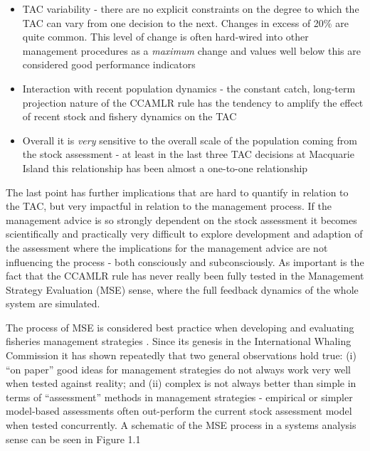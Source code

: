\documentclass[12pt,a4paper,twoside,times,sky,standard]{csiroreport2017}
\begin{document}
\begin{itemize}
    \item TAC variability - there are no explicit constraints on the degree to which the TAC can vary from one decision to the next. Changes in excess of 20\% are quite common. This level of change is often hard-wired into other management procedures as a \emph{maximum} change and values well below this are considered good performance indicators
    \item Interaction with recent population dynamics - the constant catch, long-term projection nature of the CCAMLR rule has the tendency to amplify the effect of recent stock and fishery dynamics on the TAC
    \item Overall it is \emph{very} sensitive to the overall scale of the population coming from the stock assessment - at least in the last three TAC decisions at Macquarie Island this relationship has been almost a one-to-one relationship
\end{itemize}

The last point has further implications that are hard to quantify in relation to the TAC, but very impactful in relation to the management process. If the management advice is so strongly dependent on the stock assessment it becomes scientifically and practically very difficult to explore development and adaption of the assessment where the implications for the management advice are not influencing the process - both consciously and subconsciously. As important is the fact that the CCAMLR rule has never really been fully tested in the Management Strategy Evaluation (MSE) sense, where the full feedback dynamics of the whole system are simulated. 

The process of MSE is considered best practice when developing and evaluating fisheries management strategies \cite{mse}. Since its genesis in the International Whaling Commission \cite{iwc} it has shown repeatedly that two general observations hold true: (i) ``on paper'' good ideas for management strategies do not always work very well when tested against reality; and (ii) complex is not always better than simple in terms of ``assessment'' methods in management strategies - empirical or simpler model-based assessments often out-perform the current stock assessment model when tested concurrently. A schematic of the MSE process in a systems analysis sense can be seen in Figure 1.1
\end{document}
